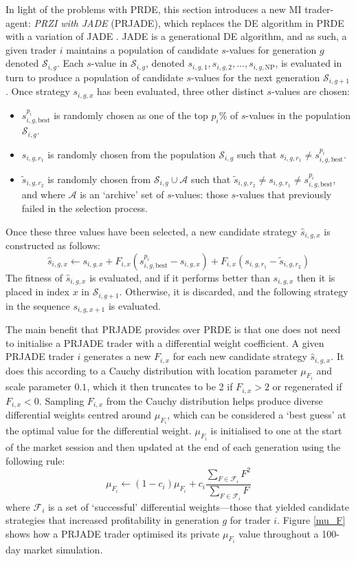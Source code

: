 \documentclass[conference]{IEEEtran}
\begin{document}
In light of the problems with PRDE, this section introduces a new MI trader-agent: \textit{PRZI with JADE} (PRJADE), which replaces the DE algorithm in PRDE with a variation of JADE \cite{ZhangSanderson}.
JADE is a generational DE algorithm, and as such, a given trader $i$ maintains a population of candidate $s$-values for generation $g$ denoted $\mathcal{S}_{i,g}$.
Each $s$-value in $\mathcal{S}_{i,g}$, denoted $s_{i,g,1}, s_{i,g,2}, ..., s_{i,g,\mathrm{NP}}$, is evaluated in turn to produce a population of candidate $s$-values for the next generation $\mathcal{S}_{i,g+1}$.
Once strategy $s_{i,g,x}$ has been evaluated, three other distinct $s$-values are chosen:
\begin{itemize}
    \item $s^{p_i}_{i,g,\text{best}}$ is randomly chosen as one of the top $p_i\%$ of $s$-values in the population $\mathcal{S}_{i,g}$.
    \item $s_{i,g,r_1}$ is randomly chosen from the population $\mathcal{S}_{i,g}$ such that $s_{i,g,r_1}\ne s^{p_i}_{i,g,\text{best}}$.
    \item $\tilde{s}_{i,g,r_2}$ is randomly chosen from $\mathcal{S}_{i,g}\cup\mathcal{A}$ such that $\tilde{s}_{i,g,r_2}\ne s_{i,g,r_1}\ne s^{p_i}_{i,g,\text{best}}$, and where $\mathcal{A}$ is an `archive' set of $s$-values: those $s$-values that previously failed in the selection process.
\end{itemize}

Once these three values have been selected, a new candidate strategy $\hat{s}_{i,g,x}$ is constructed as follows:
\[
    \hat{s}_{i,g,x}\leftarrow s_{i,g,x}+F_{i,x}\left(s^{p_i}_{i,g,\text{best}} - s_{i,g,x}\right) + F_{i,x}\left(s_{i,g,r_1} - \tilde{s}_{i,g,r_2}\right)
\]
The fitness of $\hat{s}_{i,g,x}$ is evaluated, and if it performs better than $s_{i,g,x}$ then it is placed in index $x$ in $\mathcal{S}_{i,g+1}$. 
Otherwise, it is discarded, and the following strategy in the sequence $s_{i,g,x+1}$ is evaluated.

The main benefit that PRJADE provides over PRDE is that one does not need to initialise a PRJADE trader with a differential weight coefficient.
A given PRJADE trader $i$ generates a new $F_{i,x}$ for each new candidate strategy $\hat{s}_{i,g,x}$.
It does this according to a Cauchy distribution with location parameter $\mu_{F_i}$ and scale parameter $0.1$, which it then truncates to be 2 if $F_{i,x}>2$ or regenerated if $F_{i,x}<0$.
Sampling $F_{i,x}$ from the Cauchy distribution helps produce diverse differential weights centred around $\mu_{F_i}$, which can be considered a `best guess' at the optimal value for the differential weight.
$\mu_{F_i}$ is initialised to one at the start of the market session and then updated at the end of each generation using the following rule:
\[
    \mu_{F_i}\leftarrow (1-c_i)\mu_{F_i} + c_i\frac{\sum_{F\in \mathcal{F}_i} F^2}{\sum_{F\in\mathcal{F}_i} F}
\]
where $\mathcal{F}_i$ is a set of `successful' differential weights---those that yielded candidate strategies that increased profitability in generation $g$ for trader $i$.
Figure \ref{mu_F} shows how a PRJADE trader optimised its private $\mu_{F_i}$ value throughout a 100-day market simulation.
\end{document}
